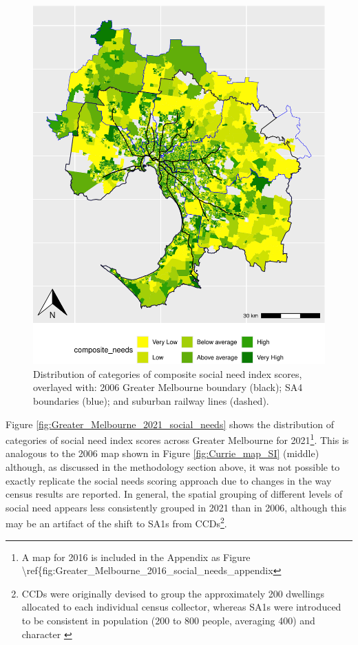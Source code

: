 \documentclass[preprint, 3p,
authoryear]{elsarticle} %
\begin{document}
\begin{figure}
\centering
\includegraphics{Leveraging_GTFS_to_assess_transit_supply_Transport_Geography_files/figure-latex/Greater_Melbourne_2021_social_needs-1.pdf}
\caption{Distribution of categories of composite social need index
scores, overlayed with: 2006 Greater Melbourne boundary (black); SA4
boundaries (blue); and suburban railway lines (dashed).}
\end{figure}

Figure \ref{fig:Greater_Melbourne_2021_social_needs} shows the
distribution of categories of social need index scores across Greater
Melbourne for 2021\footnote{A map for 2016 is included in the Appendix
  as Figure
  \textbackslash ref\{fig:Greater\_Melbourne\_2016\_social\_needs\_appendix}.
This is analogous to the 2006 map shown in Figure
\ref{fig:Currie_map_SI} (middle) although, as discussed in the
methodology section above, it was not possible to exactly replicate the
\citet{currie2010identifying} social needs scoring approach due to
changes in the way census results are reported. In general, the spatial
grouping of different levels of social need appears less consistently
grouped in 2021 than in 2006, although this may be an artifact of the
shift to SA1s from CCDs\footnote{CCDs were originally devised to group
  the approximately 200 dwellings allocated to each individual census
  collector, whereas SA1s were introduced to be consistent in population
  (200 to 800 people, averaging 400) and character \citep{ABS_SA1s_CCDs}}.
\end{document}
